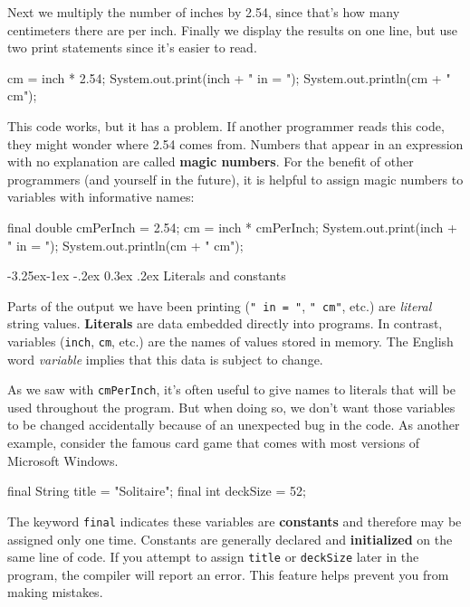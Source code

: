 \documentclass[12pt]{book}
\makeatletter
\renewcommand\subsection{\@startsection{subsection}{2}{\z@}%
    {-3.25ex\@plus -1ex \@minus -.2ex}%
    {0.3ex \@plus .2ex}%
    {\normalfont\large\bfseries}}
\theoremstyle{exercise}
\newcommand{\java}[1]{\lstinline{#1}} %
\makeatother
\begin{document}
Next we multiply the number of inches by 2.54, since that's how many centimeters there are per inch.
Finally we display the results on one line, but use two print statements since it's easier to read.

\begin{code}
    cm = inch * 2.54;
    System.out.print(inch + " in = ");
    System.out.println(cm + " cm");
\end{code}


This code works, but it has a problem.
If another programmer reads this code, they might wonder where 2.54 comes from.
Numbers that appear in an expression with no explanation are called {\bf magic numbers}.
For the benefit of other programmers (and yourself in the future), it is helpful to assign magic numbers to variables with informative names:

\begin{code}
    final double cmPerInch = 2.54;
    cm = inch * cmPerInch;
    System.out.print(inch + " in = ");
    System.out.println(cm + " cm");
\end{code}

\subsection{Literals and constants}


Parts of the output we have been printing (\java{" in = "}, \java{" cm"}, etc.) are {\em literal} string values.
{\bf Literals} are data embedded directly into programs.
In contrast, variables (\java{inch}, \java{cm}, etc.) are the names of values stored in memory.
The English word {\em variable} implies that this data is subject to change.

As we saw with \java{cmPerInch}, it's often useful to give names to literals that will be used throughout the program.
But when doing so, we don't want those variables to be changed accidentally because of an unexpected bug in the code.
As another example, consider the famous card game that comes with most versions of Microsoft Windows.

\begin{code}
    final String title = "Solitaire";
    final int deckSize = 52;
\end{code}


The keyword \java{final} indicates these variables are {\bf constants} and therefore may be assigned only one time.
Constants are generally declared and {\bf initialized} on the same line of code.
If you attempt to assign \java{title} or \java{deckSize} later in the program, the compiler will report an error.
This feature helps prevent you from making mistakes.
\end{document}
